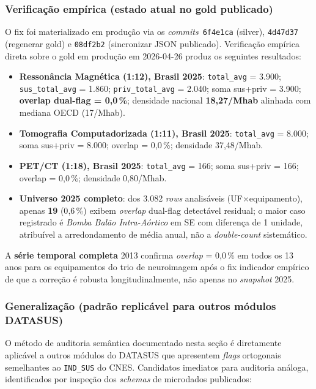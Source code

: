 \documentclass[12pt,a4paper,oneside]{article}
\begin{document}
\subsubsection{Verificação empírica (estado atual no gold
publicado)}\label{ssub:verificacao}

O fix foi materializado em produção via os
\textit{commits}~\texttt{6f4e1ca} (silver), \texttt{4d47d37}
(regenerar gold) e \texttt{08df2b2} (sincronizar JSON publicado).
Verificação empírica direta sobre o gold em produção em
2026-04-26 produz os seguintes resultados:

\begin{itemize}
\item \textbf{Ressonância Magnética (1{:}12), Brasil 2025}:
\texttt{total\_avg} = 3{.}900; \texttt{sus\_total\_avg} = 1{.}860;
\texttt{priv\_total\_avg} = 2{.}040; soma sus+priv = 3{.}900;
\textbf{overlap dual-flag = 0{,}0\,\%}; densidade nacional
\textbf{18{,}27/Mhab} \textemdash{} alinhada com mediana OECD
(17/Mhab).
\item \textbf{Tomografia Computadorizada (1{:}11), Brasil 2025}:
\texttt{total\_avg} = 8{.}000; soma sus+priv = 8{.}000;
overlap = 0{,}0\,\%; densidade 37{,}48/Mhab.
\item \textbf{PET/CT (1{:}18), Brasil 2025}: \texttt{total\_avg}
= 166; soma sus+priv = 166; overlap = 0{,}0\,\%; densidade
0{,}80/Mhab.
\item \textbf{Universo 2025 completo}: dos 3{.}082 \textit{rows}
analisáveis (UF$\times$equipamento), apenas \textbf{19} (0{,}6\,\%)
exibem \textit{overlap} dual-flag detectável residual; o maior
caso registrado é \textit{Bomba Balão Intra-Aórtico} em SE com
diferença de 1 unidade, atribuível a arredondamento de média anual,
não a \textit{double-count} sistemático.
\end{itemize}

\noindent
A \textbf{série temporal completa} 2013 confirma
\textit{overlap} = 0{,}0\,\% em todos os 13 anos para os equipamentos
do trio de neuroimagem após o fix \textemdash{} indicador empírico
de que a correção é robusta longitudinalmente, não apenas no
\textit{snapshot} 2025.

\subsubsection{Generalização (padrão replicável para outros módulos
DATASUS)}

O método de auditoria semântica documentado nesta seção é
diretamente aplicável a outros módulos do DATASUS que apresentem
\textit{flags} ortogonais semelhantes ao \texttt{IND\_SUS} do CNES.
Candidatos imediatos para auditoria análoga, identificados por
inspeção dos \textit{schemas} de microdados publicados:
\end{document}
